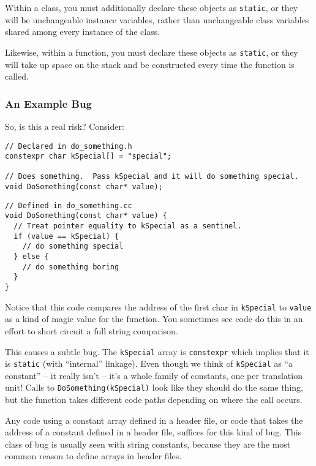 Within a class, you must additionally declare these objects as \texttt{static}, or they will be unchangeable instance variables, rather than unchangeable class variables shared among every instance of the class.

Likewise, within a function, you must declare these objects as \texttt{static}, or they will take up space on the stack and be constructed every time the function is called.

\subsubsection{An Example Bug}\label{subsubsec:an-example-bug}
So, is this a real risk? Consider:
\begin{verbatim}
// Declared in do_something.h
constexpr char kSpecial[] = "special";

// Does something.  Pass kSpecial and it will do something special.
void DoSomething(const char* value);
\end{verbatim}
\begin{verbatim}
// Defined in do_something.cc
void DoSomething(const char* value) {
  // Treat pointer equality to kSpecial as a sentinel.
  if (value == kSpecial) {
    // do something special
  } else {
    // do something boring
  }
}
\end{verbatim}
Notice that this code compares the address of the first char in \texttt{kSpecial} to \texttt{value} as a kind of magic value for the function. You sometimes see code do this in an effort to short circuit a full string comparison.

This causes a subtle bug. The \texttt{kSpecial} array is \texttt{constexpr} which implies that it is \texttt{static} (with \enquote{internal} linkage). Even though we think of \texttt{kSpecial} as \enquote{a constant} – it really isn’t – it’s a whole family of constants, one per translation unit! Calls to \texttt{DoSomething(kSpecial)} look like they should do the same thing, but the function takes different code paths depending on where the call occurs.

Any code using a constant array defined in a header file, or code that takes the address of a constant defined in a header file, suffices for this kind of bug. This class of bug is usually seen with string constants, because they are the most common reason to define arrays in header files.


